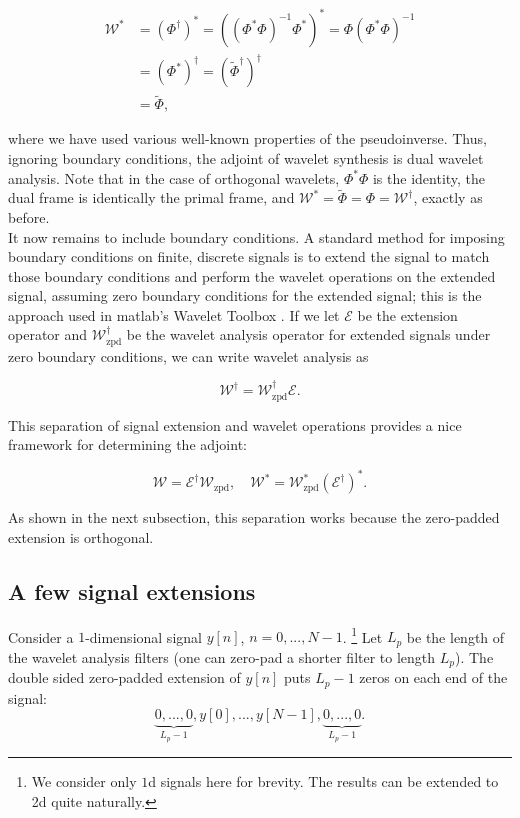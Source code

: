 \documentclass[journal]{IEEEtran}
\begin{document}
\begin{align*}
   \mathcal{W}^\ast &= \left(\Phi^\dagger\right)^\ast = \left(\left(\Phi^\ast\Phi\right)^{-1}\Phi^\ast\right)^\ast = \Phi\left(\Phi^\ast\Phi\right)^{-1}\\ 
                    &= \left(\Phi^\ast\right)^\dagger = \left(\tilde{\Phi}^\dagger\right)^\dagger\\
                    &= \tilde{\Phi},
\end{align*}

\noindent where we have used various well-known properties of the pseudoinverse.  Thus, ignoring boundary conditions, the adjoint of wavelet synthesis is dual wavelet analysis.  Note that in the case of orthogonal wavelets, $\Phi^\ast\Phi$ is the identity, the dual frame is identically the primal frame, and ${\mathcal{W}^\ast = \tilde{\Phi}=\Phi=\mathcal{W}^\dagger}$, exactly as before.\\

It now remains to include boundary conditions.  A standard method for imposing boundary conditions on finite, discrete signals is to extend the signal to match those boundary conditions and perform the wavelet operations on the extended signal, assuming zero boundary conditions for the extended signal; this is the approach used in {\sc matlab}'s Wavelet Toolbox \cite{matlab_wt_2015}.  If we let $\mathcal{E}$ be the extension operator and $\mathcal{W}^\dagger_\text{zpd}$ be the wavelet analysis operator for extended signals under zero boundary conditions, we can write wavelet analysis as 

\[ \mathcal{W}^\dagger = \mathcal{W}^\dagger_\text{zpd}\mathcal{E}. \] 

\noindent This separation of signal extension and wavelet operations provides a nice framework for determining the adjoint:

\[ \mathcal{W} = \mathcal{E}^\dagger\mathcal{W}_\text{zpd}, \quad \mathcal{W}^\ast = \mathcal{W}^\ast_\text{zpd}(\mathcal{E}^\dagger)^\ast. \] 

\noindent As shown in the next subsection, this separation works because the zero-padded extension is orthogonal.\\

\subsection{A few signal extensions}
Consider a $1$-dimensional signal $y[n]$, $n=0,...,N-1$.  \footnote{We consider only $1$d signals here for brevity.  The results can be extended to 2d quite naturally.}  Let $L_p$ be the length of the wavelet analysis filters (one can zero-pad a shorter filter to length $L_p$).  The double sided zero-padded extension of $y[n]$ puts $L_p-1$ zeros on each end of the signal:
\[ \underbrace{0, ..., 0}_{L_p-1}, y[0], ..., y[N-1], \underbrace{0, ..., 0}_{L_p-1}. \]
\end{document}
